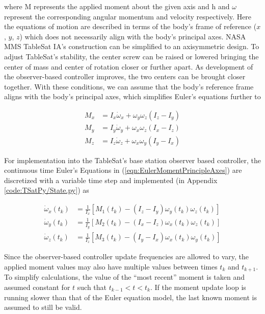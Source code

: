 where M represents the applied moment about the given axis and h and $\omega$ represent the corresponding angular momentum and velocity respectively.  Here the equations of motion are described in terms of the body's frame of reference ($x$, $y$, $z$) which does not necessarily align with the body's principal axes.  NASA MMS TableSat IA's construction can be simplified to an axisymmetric design.  To adjust TableSat's stability, the center screw can be raised or lowered bringing the center of mass and center of rotation closer or further apart.  As development of the observer-based controller improves, the two centers can be brought closer together.  With these conditions, we can assume that the body's reference frame aligns with the body's principal axes, which simplifies Euler's equations further to

\begin{subequations}
  \begin{align}
    M_x & = I_x \dot{\omega}_x + \omega_y \omega_z (I_z - I_y) \\
    M_y & = I_y \dot{\omega}_y + \omega_x \omega_z (I_x - I_z) \\
    M_z & = I_z \dot{\omega}_z + \omega_x \omega_y (I_y - I_x)
  \end{align}
  \label{eqn:EulerMomentPrincipleAxes}
\end{subequations}

For implementation into the TableSat's base station observer based controller, the continuous time Euler's Equations in (\ref{eqn:EulerMomentPrincipleAxes}) are discretized with a variable time step and implemented (in Appendix \ref{code:TSatPy/State.py}) as

\begin{subequations}
  \begin{align}
    \dot{\omega}_{x}(t_{k}) & = \frac{1}{I_x} \left[ M_1(t_{k}) - (I_z - I_y) \omega_{y}(t_k) \omega_{z}(t_k) \right] \\
    \dot{\omega}_{y}(t_{k}) & = \frac{1}{I_y} \left[ M_2(t_{k}) - (I_x - I_z) \omega_{x}(t_k) \omega_{z}(t_k) \right] \\
    \dot{\omega}_{z}(t_{k}) & = \frac{1}{I_z} \left[ M_3(t_{k}) - (I_y - I_x) \omega_{x}(t_k) \omega_{y}(t_k) \right]
  \end{align}
  \label{eqn:DiscreteEulerMomentEquations}
\end{subequations}

Since the observer-based controller update frequencies are allowed to vary, the applied moment values may also have multiple values between times $t_{k}$ and $t_{k+1}$.  To simplify calculations, the value of the ``most recent'' moment is taken and assumed constant for $t$ such that $t_{k-1} < t < t_{k}$.  If the moment update loop is running slower than that of the Euler equation model, the last known moment is assumed to still be valid.

